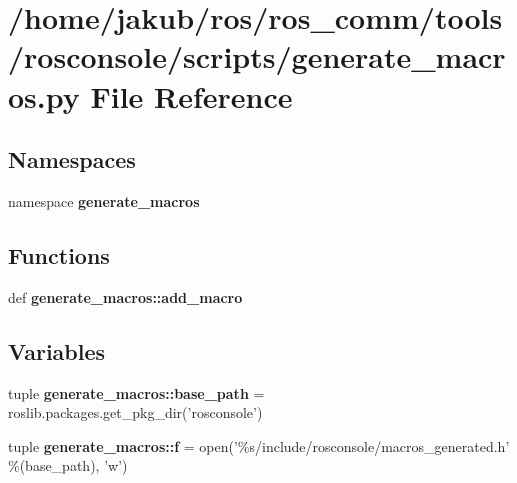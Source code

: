 \section{/home/jakub/ros/ros\_\-comm/tools/rosconsole/scripts/generate\_\-macros.py File Reference}
\label{generate__macros_8py}
\subsection*{Namespaces}
\begin{DoxyCompactItemize}
\item 
namespace {\bf generate\_\-macros}
\end{DoxyCompactItemize}
\subsection*{Functions}
\begin{DoxyCompactItemize}
\item 
def {\bf generate\_\-macros::add\_\-macro}
\end{DoxyCompactItemize}
\subsection*{Variables}
\begin{DoxyCompactItemize}
\item 
tuple {\bf generate\_\-macros::base\_\-path} = roslib.packages.get\_\-pkg\_\-dir('rosconsole')
\item 
tuple {\bf generate\_\-macros::f} = open('\%s/include/rosconsole/macros\_\-generated.h' \%(base\_\-path), 'w')
\end{DoxyCompactItemize}
